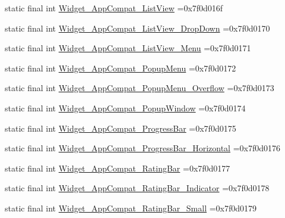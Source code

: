 \begin{DoxyCompactItemize}
static final int \mbox{\hyperlink{classbr_1_1unb_1_1cic_1_1mp_1_1marketmaster_1_1R_1_1style_ac561fba0d57ba2daa0fd8f86d70ba175}{Widget\+\_\+\+App\+Compat\+\_\+\+List\+View}} =0x7f0d016f
\item 
static final int \mbox{\hyperlink{classbr_1_1unb_1_1cic_1_1mp_1_1marketmaster_1_1R_1_1style_ad1a6487f5aed26eb2bcc91687b3a7740}{Widget\+\_\+\+App\+Compat\+\_\+\+List\+View\+\_\+\+Drop\+Down}} =0x7f0d0170
\item 
static final int \mbox{\hyperlink{classbr_1_1unb_1_1cic_1_1mp_1_1marketmaster_1_1R_1_1style_a23b77b0be60dedd86a2c50596b043e66}{Widget\+\_\+\+App\+Compat\+\_\+\+List\+View\+\_\+\+Menu}} =0x7f0d0171
\item 
static final int \mbox{\hyperlink{classbr_1_1unb_1_1cic_1_1mp_1_1marketmaster_1_1R_1_1style_a3539b36ad9befa94467768c4a5233870}{Widget\+\_\+\+App\+Compat\+\_\+\+Popup\+Menu}} =0x7f0d0172
\item 
static final int \mbox{\hyperlink{classbr_1_1unb_1_1cic_1_1mp_1_1marketmaster_1_1R_1_1style_ad24c308b8fce6e4f125bece57df8c5cc}{Widget\+\_\+\+App\+Compat\+\_\+\+Popup\+Menu\+\_\+\+Overflow}} =0x7f0d0173
\item 
static final int \mbox{\hyperlink{classbr_1_1unb_1_1cic_1_1mp_1_1marketmaster_1_1R_1_1style_aa027cbe6a6c011af26ae21a15b60c634}{Widget\+\_\+\+App\+Compat\+\_\+\+Popup\+Window}} =0x7f0d0174
\item 
static final int \mbox{\hyperlink{classbr_1_1unb_1_1cic_1_1mp_1_1marketmaster_1_1R_1_1style_a81da6b4d97f46b34802ca1db26f7b194}{Widget\+\_\+\+App\+Compat\+\_\+\+Progress\+Bar}} =0x7f0d0175
\item 
static final int \mbox{\hyperlink{classbr_1_1unb_1_1cic_1_1mp_1_1marketmaster_1_1R_1_1style_a940572f3808e24da71f59ecd508d8a5e}{Widget\+\_\+\+App\+Compat\+\_\+\+Progress\+Bar\+\_\+\+Horizontal}} =0x7f0d0176
\item 
static final int \mbox{\hyperlink{classbr_1_1unb_1_1cic_1_1mp_1_1marketmaster_1_1R_1_1style_acd2510d03b71b1e6f9432743f63b3943}{Widget\+\_\+\+App\+Compat\+\_\+\+Rating\+Bar}} =0x7f0d0177
\item 
static final int \mbox{\hyperlink{classbr_1_1unb_1_1cic_1_1mp_1_1marketmaster_1_1R_1_1style_a2217f019c5e82aad59002467f7560295}{Widget\+\_\+\+App\+Compat\+\_\+\+Rating\+Bar\+\_\+\+Indicator}} =0x7f0d0178
\item 
static final int \mbox{\hyperlink{classbr_1_1unb_1_1cic_1_1mp_1_1marketmaster_1_1R_1_1style_a5f0d04cb56a5de899c0766883bc5c6db}{Widget\+\_\+\+App\+Compat\+\_\+\+Rating\+Bar\+\_\+\+Small}} =0x7f0d0179

\end{DoxyCompactItemize}
